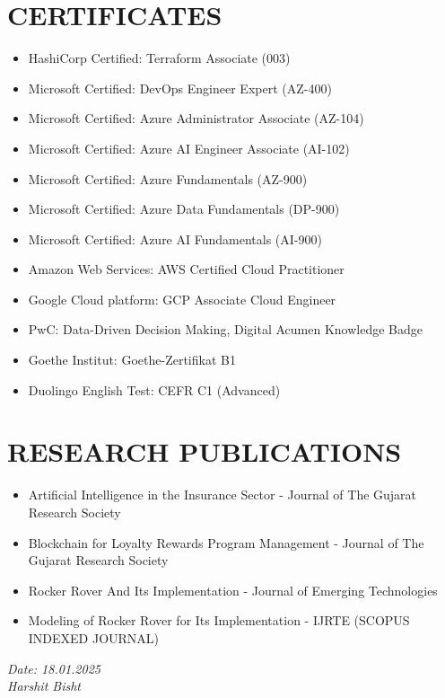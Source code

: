 \documentclass[11pt,a4paper]{article}
\begin{document}
\section*{CERTIFICATES}
\begin{itemize}
    \item HashiCorp Certified: Terraform Associate (003)
    \item Microsoft Certified: DevOps Engineer Expert (AZ-400)
    \item Microsoft Certified: Azure Administrator Associate (AZ-104)
    \item Microsoft Certified: Azure AI Engineer Associate (AI-102)
    \item Microsoft Certified: Azure Fundamentals (AZ-900)
    \item Microsoft Certified: Azure Data Fundamentals (DP-900)
    \item Microsoft Certified: Azure AI Fundamentals (AI-900)
    \item Amazon Web Services: AWS Certified Cloud Practitioner
    \item Google Cloud platform: GCP Associate Cloud Engineer
    \item PwC: Data-Driven Decision Making, Digital Acumen Knowledge Badge
    \item Goethe Institut: Goethe-Zertifikat B1
    \item Duolingo English Test: CEFR C1 (Advanced)
\end{itemize}

\section*{RESEARCH PUBLICATIONS}
\begin{itemize}
    \item Artificial Intelligence in the Insurance Sector - Journal of The Gujarat Research Society
    \item Blockchain for Loyalty Rewards Program Management - Journal of The Gujarat Research Society
    \item Rocker Rover And Its Implementation - Journal of Emerging Technologies
    \item Modeling of Rocker Rover for Its Implementation - IJRTE (SCOPUS INDEXED JOURNAL)
\end{itemize}

\vfill %
\noindent %
\begin{flushright} %
    \textit{Date: 18.01.2025}\\ %
    \textit{Harshit Bisht} %
\end{flushright}
\end{document}
